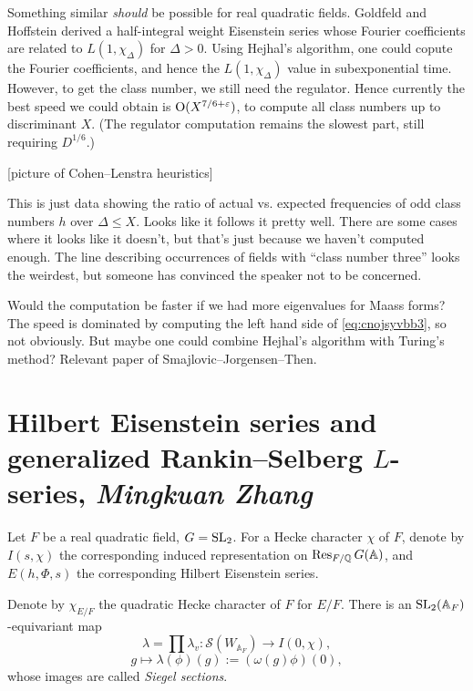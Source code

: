 \documentclass[reqno]{amsart} 
\begin{document}
Something similar \emph{should} be possible for real quadratic fields.  Goldfeld and Hoffstein \cite{MR788407} derived a half-integral weight Eisenstein series whose Fourier coefficients are related to $L(1, \chi_{\Delta})$ for $\Delta > 0$.  Using Hejhal's algorithm, one could copute the Fourier coefficients, and hence the $L(1, \chi_\Delta)$ value in subexponential time.  However, to get the class number, we still need the regulator.  Hence currently the best speed we could obtain is $\operatorname{O}(X^{7/6 + \varepsilon})$, to compute all class numbers up to discriminant $X$.  (The regulator computation remains the slowest part, still requiring $D^{1/6}$.)

[picture of Cohen--Lenstra heuristics]

This is just data showing the ratio of actual vs. expected frequencies of odd class numbers $h$ over $\Delta \leq X$.  Looks like it follows it pretty well.  There are some cases where it looks like it doesn't, but that's just because we haven't computed enough.  The line describing occurrences of fields with ``class number three'' looks the weirdest, but someone has convinced the speaker not to be concerned.

Would the computation be faster if we had more eigenvalues for Maass forms?  The speed is dominated by computing the left hand side of \eqref{eq:cnojsyvbb3}, so not obviously.  But maybe one could combine Hejhal's algorithm with Turing's method?  Relevant paper of Smajlovic--Jorgensen--Then.

\section{Hilbert Eisenstein series and generalized Rankin--Selberg $L$-series, \textnormal{\emph{Mingkuan Zhang}}}

Let $F$ be a real quadratic field, $G = \operatorname{SL}_2$.  For a Hecke character $\chi$ of $F$, denote by $I (s, \chi)$ the corresponding induced representation on $\operatorname{Res}_{F/\mathbb{Q}} G(\mathbb{A})$, and $E(h, \Phi, s)$ the corresponding Hilbert Eisenstein series.

Denote by $\chi_{E/F}$ the quadratic Hecke character of $F$ for $E/F$.  There is an $\operatorname{SL}_2(\mathbb{A}_F)$-equivariant map
\begin{equation*}
  \lambda = \prod \lambda_v : \mathcal{S}(W_{\mathbb{A}_F}) \rightarrow I(0, \chi),
\end{equation*}
\begin{equation*}
  g \mapsto \lambda(\phi)(g) :=(\omega(g) \phi)(0),
\end{equation*}
whose images are called \emph{Siegel sections}.
\end{document}
